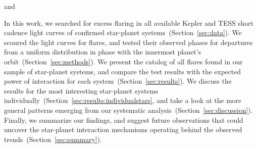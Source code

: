\documentclass[twocolumn]{aastex631}
\begin{document}
\citet{fischer2019timevariable} and \citet{howard2021evryflare}

In this work, we searched for excess flaring in all available Kepler and TESS short cadence light curves of confirmed star-planet systems~(Section~\ref{sec:data}). We scoured the light curves for flares, and tested their observed phases for departures from a uniform distribution in phase with the innermost planet's orbit~(Section~\ref{sec:methods}). We present the catalog of all flares found in our sample of star-planet systems, and compare the test results with the expected power of interaction for each system~(Section~\ref{sec:results}). We discuss the results for the most interesting star-planet systems individually~(Section~\ref{sec:results:individualstars}, and take a look at the more general patterns emerging from our systematic analysis~(Section~\ref{sec:discussion}). Finally, we summarize our findings, and suggest future observations that could uncover the star-planet interaction mechanisms operating behind the observed trends~(Section~\ref{sec:summary}). 








\end{document}
